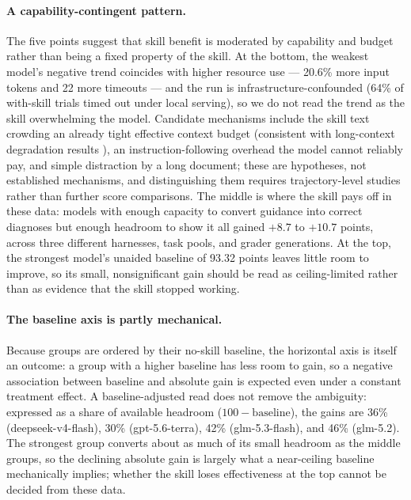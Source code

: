 \documentclass[11pt]{article}
\begin{document}
\paragraph{A capability-contingent pattern.}
The five points suggest that skill benefit is moderated by capability and budget rather than being a fixed property of the skill.
At the bottom, the weakest model's negative trend coincides with higher resource use --- 20.6\% more input tokens and 22 more timeouts --- and the run is infrastructure-confounded (64\% of with-skill trials timed out under local serving), so we do not read the trend as the skill overwhelming the model.
Candidate mechanisms include the skill text crowding an already tight effective context budget (consistent with long-context degradation results \citep{lost-in-the-middle}), an instruction-following overhead the model cannot reliably pay, and simple distraction by a long document; these are hypotheses, not established mechanisms, and distinguishing them requires trajectory-level studies rather than further score comparisons.
The middle is where the skill pays off in these data: models with enough capacity to convert guidance into correct diagnoses but enough headroom to show it all gained $+8.7$ to $+10.7$ points, across three different harnesses, task pools, and grader generations.
At the top, the strongest model's unaided baseline of 93.32 points leaves little room to improve, so its small, nonsignificant gain should be read as ceiling-limited rather than as evidence that the skill stopped working.

\paragraph{The baseline axis is partly mechanical.}
Because groups are ordered by their no-skill baseline, the horizontal axis is itself an outcome: a group with a higher baseline has less room to gain, so a negative association between baseline and absolute gain is expected even under a constant treatment effect.
A baseline-adjusted read does not remove the ambiguity: expressed as a share of available headroom ($100 - \text{baseline}$), the gains are 36\% (deepseek-v4-flash), 30\% (gpt-5.6-terra), 42\% (glm-5.3-flash), and 46\% (glm-5.2).
The strongest group converts about as much of its small headroom as the middle groups, so the declining absolute gain is largely what a near-ceiling baseline mechanically implies; whether the skill loses effectiveness at the top cannot be decided from these data.
\end{document}
